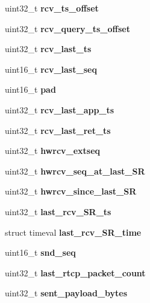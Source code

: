 \begin{DoxyCompactItemize}
\item 
\mbox{\label{struct__RtpStream_a6eef843dc46010f5fb2a0de7a6c65e6e}} 
uint32\+\_\+t {\bfseries rcv\+\_\+ts\+\_\+offset}
\item 
\mbox{\label{struct__RtpStream_a221a8f7c224d27f4398b517a7cf3241f}} 
uint32\+\_\+t {\bfseries rcv\+\_\+query\+\_\+ts\+\_\+offset}
\item 
\mbox{\label{struct__RtpStream_a2b3178cfab529fbe94321ad42e17dc39}} 
uint32\+\_\+t {\bfseries rcv\+\_\+last\+\_\+ts}
\item 
\mbox{\label{struct__RtpStream_ada59d9aac414afd48ffe286cae0a75ea}} 
uint16\+\_\+t {\bfseries rcv\+\_\+last\+\_\+seq}
\item 
\mbox{\label{struct__RtpStream_a860bdd128fa6fae88457644c2df14ab6}} 
uint16\+\_\+t {\bfseries pad}
\item 
\mbox{\label{struct__RtpStream_aaef25994c22b8088503efa5aa0695857}} 
uint32\+\_\+t {\bfseries rcv\+\_\+last\+\_\+app\+\_\+ts}
\item 
\mbox{\label{struct__RtpStream_ae3c66d24d2c0f23980bd7cb34781aad5}} 
uint32\+\_\+t {\bfseries rcv\+\_\+last\+\_\+ret\+\_\+ts}
\item 
\mbox{\label{struct__RtpStream_a7f3e1c39dc3273afae3e2559d9b92555}} 
uint32\+\_\+t {\bfseries hwrcv\+\_\+extseq}
\item 
\mbox{\label{struct__RtpStream_aa31ae10dc550165eaf59582a93f27fae}} 
uint32\+\_\+t {\bfseries hwrcv\+\_\+seq\+\_\+at\+\_\+last\+\_\+\+SR}
\item 
\mbox{\label{struct__RtpStream_ad99c412bfacad393ad9f85f8addfd8c8}} 
uint32\+\_\+t {\bfseries hwrcv\+\_\+since\+\_\+last\+\_\+\+SR}
\item 
\mbox{\label{struct__RtpStream_ad4c0748cb9dc1e0fdecb727b6b861d34}} 
uint32\+\_\+t {\bfseries last\+\_\+rcv\+\_\+\+S\+R\+\_\+ts}
\item 
\mbox{\label{struct__RtpStream_a985c3197bbf6b3ea344716fc85d0ba73}} 
struct timeval {\bfseries last\+\_\+rcv\+\_\+\+S\+R\+\_\+time}
\item 
\mbox{\label{struct__RtpStream_aac3a7d2d9c33988b7fd47aabcbf71167}} 
uint16\+\_\+t {\bfseries snd\+\_\+seq}
\item 
\mbox{\label{struct__RtpStream_a9c71d6fab69b21e78eff345e997df337}} 
uint32\+\_\+t {\bfseries last\+\_\+rtcp\+\_\+packet\+\_\+count}
\item 
\mbox{\label{struct__RtpStream_a17e44929de4e0a1bc613c07bc570eed7}} 
uint32\+\_\+t {\bfseries sent\+\_\+payload\+\_\+bytes}
\item 
\mbox{\label{struct__RtpStream_a4c77c4929a01d92168b42c890ef409f9}} 

\end{DoxyCompactItemize}
